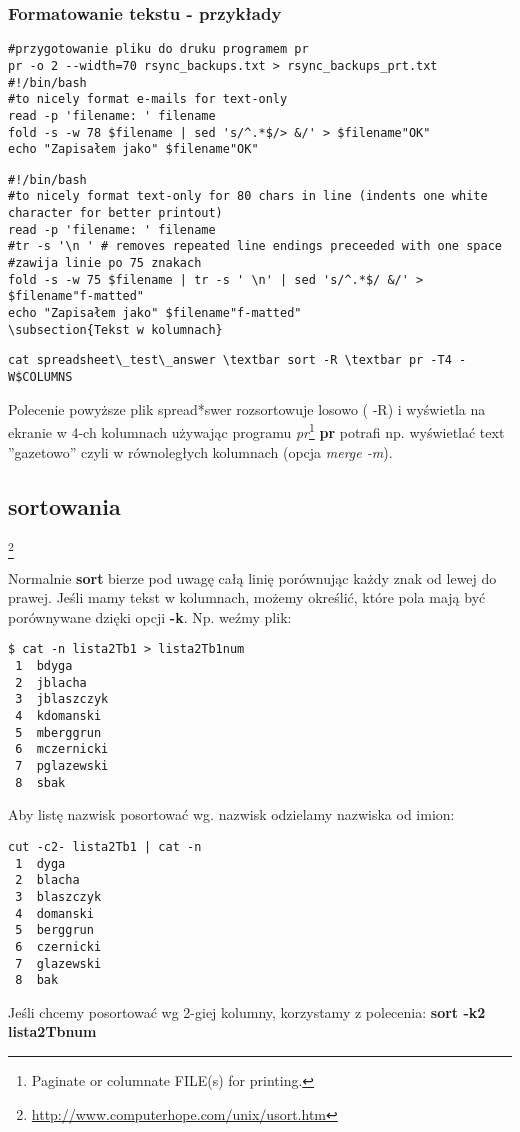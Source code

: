 \documentclass[a4paper,titlepage,12pt]{mwart}
\begin{document}
\subsubsection{Formatowanie tekstu - przykłady}
\begin{verbatim}
#przygotowanie pliku do druku programem pr
pr -o 2 --width=70 rsync_backups.txt > rsync_backups_prt.txt
#!/bin/bash
#to nicely format e-mails for text-only
read -p 'filename: ' filename
fold -s -w 78 $filename | sed 's/^.*$/> &/' > $filename"OK"
echo "Zapisałem jako" $filename"OK"
\end{verbatim}
\begin{verbatim}
#!/bin/bash
#to nicely format text-only for 80 chars in line (indents one white character for better printout)
read -p 'filename: ' filename
#tr -s '\n ' # removes repeated line endings preceeded with one space
#zawija linie po 75 znakach
fold -s -w 75 $filename | tr -s ' \n' | sed 's/^.*$/ &/' > $filename"f-matted"
echo "Zapisałem jako" $filename"f-matted"
\subsection{Tekst w kolumnach}
\end{verbatim}
\begin{verbatim}
cat spreadsheet\_test\_answer \textbar sort -R \textbar pr -T4 -W$COLUMNS
\end{verbatim}
Polecenie powyższe plik spread*swer rozsortowuje losowo ( -R) i wyświetla na ekranie w 4-ch kolumnach używając programu \textit{pr}\footnote{Paginate or columnate FILE(s) for printing.} \textbf{pr} potrafi np. wyświetlać text ''gazetowo'' czyli w równoległych kolumnach (opcja \textit{merge -m}).
\subsection{sortowania}
\footnote{\url{http://www.computerhope.com/unix/usort.htm}}

Normalnie \textbf{sort} bierze pod uwagę całą linię porównując każdy znak od lewej do prawej. Jeśli mamy tekst w kolumnach, możemy określić, które pola mają być porównywane dzięki opcji \textbf{ -k}.
Np. weźmy plik:
\begin{verbatim}
$ cat -n lista2Tb1 > lista2Tb1num 
 1	bdyga
 2	jblacha
 3	jblaszczyk
 4	kdomanski
 5	mberggrun
 6	mczernicki
 7	pglazewski
 8	sbak

\end{verbatim}
Aby listę nazwisk posortować wg. nazwisk odzielamy nazwiska od imion:\newline
\begin{verbatim}
cut -c2- lista2Tb1 | cat -n
 1	dyga
 2	blacha
 3	blaszczyk
 4	domanski
 5	berggrun
 6	czernicki
 7	glazewski
 8	bak
\end{verbatim}
Jeśli chcemy posortować wg 2-giej kolumny, korzystamy z polecenia:
\textbf{sort -k2 lista2Tbnum}
\end{document}
